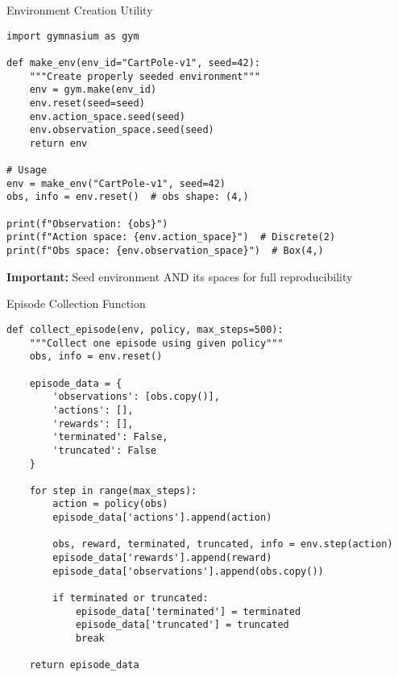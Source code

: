 \documentclass[aspectratio=169,10pt]{beamer}
\begin{document}
\begin{frame}[fragile]{Environment Creation Utility}

\begin{lstlisting}
import gymnasium as gym

def make_env(env_id="CartPole-v1", seed=42):
    """Create properly seeded environment"""
    env = gym.make(env_id)
    env.reset(seed=seed)
    env.action_space.seed(seed)
    env.observation_space.seed(seed)
    return env

# Usage
env = make_env("CartPole-v1", seed=42)
obs, info = env.reset()  # obs shape: (4,)

print(f"Observation: {obs}")
print(f"Action space: {env.action_space}")  # Discrete(2)
print(f"Obs space: {env.observation_space}")  # Box(4,)
\end{lstlisting}

\vfill

\textbf{Important:} Seed environment AND its spaces for full reproducibility

\end{frame}

\begin{frame}[fragile,shrink=5]{Episode Collection Function}

\begin{lstlisting}
def collect_episode(env, policy, max_steps=500):
    """Collect one episode using given policy"""
    obs, info = env.reset()
    
    episode_data = {
        'observations': [obs.copy()],
        'actions': [],
        'rewards': [],
        'terminated': False,
        'truncated': False
    }
    
    for step in range(max_steps):
        action = policy(obs)
        episode_data['actions'].append(action)
        
        obs, reward, terminated, truncated, info = env.step(action)
        episode_data['rewards'].append(reward)
        episode_data['observations'].append(obs.copy())
        
        if terminated or truncated:
            episode_data['terminated'] = terminated
            episode_data['truncated'] = truncated
            break
    
    return episode_data
\end{lstlisting}

\end{frame}
\end{document}
